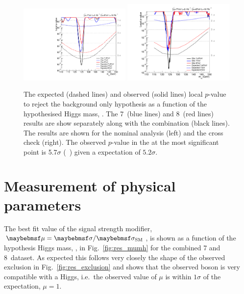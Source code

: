 \begin{figure}
  \includegraphics[width=0.49\textwidth]{results/plots/mva_pval.pdf}
  \includegraphics[width=0.49\textwidth]{results/plots/sideband_pval_fix.pdf}
  \caption[The expected and observed local $p$-value to reject the background hypothesis]{The expected (dashed lines) and observed (solid lines) local $p$-value to reject the background only hypothesis as a function of the hypothesised Higgs mass, \mH. The 7~\TeV (blue lines) and 8~\TeV (red lines) results are show separately along with the combination (black lines). The results are shown for the nominal \MFM analysis (left) and the cross check \SMVA (right). The observed $p$-value in the \MFM at the most significant point is 5.7$\sigma$ (~\GeV) given a \SM expectation of $5.2\sigma$.}
  \label{fig:res_pvalue}
\end{figure}

\section{Measurement of physical parameters}

The best fit value of the signal strength modifier, $\mu=\musm$, is shown as a function of the hypothesis Higgs mass, \mH, in Fig.~\ref{fig:res_mumh} for the combined 7 and 8~\TeV dataset. As expected this follows very closely the shape of the observed exclusion in Fig.~\ref{fig:res_exclusion} and shows that the observed boson is very compatible with a \SM Higgs, i.e.~the observed value of $\mu$ is within $1\sigma$ of the \SM expectation, $\mu=1$. 

